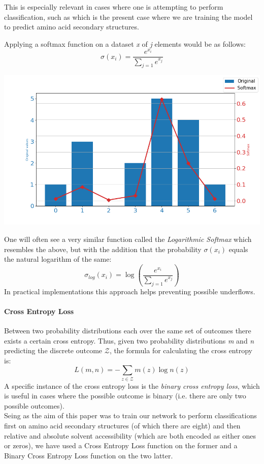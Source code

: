 \begin{multicols}{2}
This is especially relevant in cases where one is attempting to perform classification, such as which is the present case where we are training the model to predict amino acid secondary structures. 

Applying a softmax function on a dataset \textit{x} of \textit{j} elements would be as follows:
$$
\sigma(x_i) = \frac{e^{x_i}}{\sum_{j=1} e^{x_j}}
$$

\begin{Figure}
 \centering
 \includegraphics[width=\linewidth]{../graphs/softmax}
 \captionsetup{width=0.8\linewidth, font=small}
\end{Figure}
One will often see a very similar function called the \textit{Logarithmic Softmax} which resembles the above, but with the addition that the probability $\sigma(x_i)$ equals the natural logarithm of the same:
\[
\sigma_{log}\left(x_{i}\right)=\log \left(\frac{e^{ x_{i}}}{\sum_{j=1} e^{ x_{j}}}\right)
\]
In practical implementations this approach helps preventing possible underflows.



\paragraph{Cross Entropy Loss}
Between two probability distributions each over the same set of outcomes there exists a certain cross entropy.
Thus, given two probability distributions \textit{m} and \textit{n} predicting the discrete outcome $\mathcal{Z}$, the formula for calculating the cross entropy is:
$$L ( m , n ) = - \sum _ { z \in \mathcal { Z } } m ( z ) \log n ( z )$$
A specific instance of the cross entropy loss is the \textit{binary cross entropy loss}, which is useful in cases where the possible outcome is binary (i.e. there are only two possible outcomes). 
\\
Seing as the aim of this paper was to train our network to perform classifications first on amino acid secondary structures (of which there are eight) and then relative and absolute solvent accessibility (which are both encoded as either ones or zeros), we have used a Cross Entropy Loss function on the former and a Binary Cross Entropy Loss function on the two latter.



\end{multicols}
